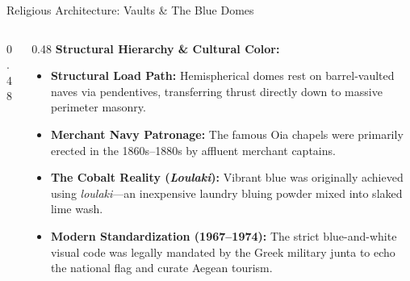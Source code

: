 \begin{frame}[label=domes]{Religious Architecture: Vaults \& The Blue Domes}
  \begin{columns}[T, onlytextwidth]
    \begin{column}{0.48\textwidth}
    \end{column}
    
    \begin{column}{0.48\textwidth}
      \textbf{\color{aegeanblue}Structural Hierarchy \& Cultural Color:}
      \vspace{0.2em}
      \begin{itemize}
        \setlength{\itemsep}{0.2em}
        \item \textbf{Structural Load Path:} Hemispherical domes rest on barrel-vaulted naves via pendentives, transferring thrust directly down to massive perimeter masonry.
        \item \textbf{Merchant Navy Patronage:} The famous Oia chapels were primarily erected in the 1860s--1880s by affluent merchant captains.
        \item \textbf{The Cobalt Reality (\textit{Loulaki}):} Vibrant blue was originally achieved using \textit{loulaki}---an inexpensive laundry bluing powder mixed into slaked lime wash.
        \item \textbf{Modern Standardization (1967--1974):} The strict blue-and-white visual code was legally mandated by the Greek military junta to echo the national flag and curate Aegean tourism.
      \end{itemize}
    \end{column}
  \end{columns}
\end{frame}

